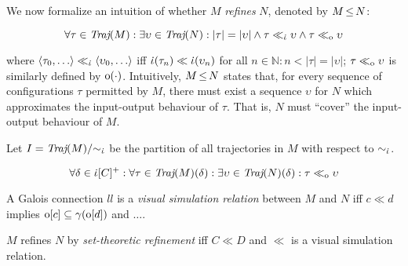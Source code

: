 We now formalize an intuition of whether $M$ \textit{refines} $N$, denoted by $M \operatorname{\leq} N$:

\begin{equation*}
\forall \tau \in \operatorname{\textit{Traj}}(M) : \exists \upsilon \in \operatorname{\textit{Traj}}(N) : | \tau | = | \upsilon | \wedge \tau \ll_{\dot{\iota}} \upsilon \wedge \tau \ll_{\mathrm{o}} \upsilon
\end{equation*}

\noindent where $\langle \tau_{0}, \ldots \rangle \ll_{\dot{\iota}} \langle \upsilon_{0}, \ldots \rangle$ iff $\dot{\iota}(\tau_{n}) \ll \dot{\iota}(\upsilon_{n})$ for all $n \in \mathbb{N} : n < | \tau | = | \upsilon |$; $\tau \ll_{\mathrm{o}} \upsilon$ is similarly defined by $\mathrm{o}(\cdot)$. Intuitively, $M \operatorname{\leq} N$ states that, for every sequence of configurations $\tau$ permitted by $M$, there must exist a sequence $\upsilon$ for $N$ which approximates the input-output behaviour of $\tau$. That is, $N$ must ``cover'' the input-output behaviour of $M$.

 Let $I = \operatorname{\textit{Traj}}(M) / \mkern-5mu\sim_{\dot{\iota}}$ be the partition of all trajectories in $M$ with respect to $\sim_{\dot{\iota}}$. 


\begin{equation*}
\forall \delta \in \dot{\iota}[C]^{+} : \forall \tau \in \operatorname{\textit{Traj}}(M)(\delta) : \exists \upsilon \in \operatorname{\textit{Traj}}(N)(\delta) : \tau \ll_{\mathrm{o}} \upsilon
\end{equation*}

\noindent {}



A Galois connection $ll$ is a \textit{visual simulation relation} between $M$ and $N$ iff $c \ll d$ implies $\mathrm{o}[c] \subseteq \gamma(\mathrm{o}[d])$ and $\ldots$.

$M$ refines $N$ by \textit{set-theoretic refinement} iff $C \ll D$ and $\ll$ is a visual simulation relation.

